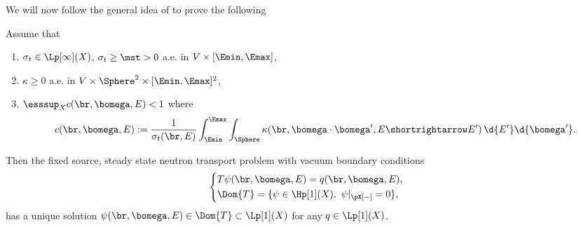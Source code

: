 We will now follow the general idea of \cite[Chap. XXI, \S 2, Proposition 5]{DautrayLions} to prove the following

\begin{theorem}\label{thm1}
Assume that
\begin{enumerate}[label=(\alph*)]
	\item $\sigma_t \in \Lp[\infty](X)$, $\sigma_t \geq \mst > 0$ a.e. in $V\times[\Emin,\Emax]$,
	\item $\kappa \geq 0$ a.e. in $V\times\Sphere^2\times[\Emin,\Emax]^2$,
	\item $\displaystyle\esssup_{X} c(\br,\bomega,E) < 1$ where
	  \begin{equation}\label{eq:c}
	    c(\br,\bomega,E) := \frac{1}{\sigma_t(\br,E)}\int_{\Emin}^{\Emax}\int_{\Sphere} \kappa(\br,\bomega\cdot\bomega',
	    E\shortrightarrow E')\,\d{E'}\d{\bomega'}.
	  \end{equation}
\end{enumerate}
Then the fixed source, steady state neutron transport problem with vacuum boundary conditions 
\begin{equation*}
  \left\{
  \begin{aligned}
     &T\psi(\br,\bomega,E) = q(\br,\bomega,E),\\
     &\Dom{T} = \{\psi\in \Hp[1](X),\ \psi\vert_{\pX[-]} = 0\},
  \end{aligned}
  \right.
\end{equation*}
has a unique solution $\psi(\br,\bomega,E)\in\Dom{T}\subset\Lp[1](X)$ for any $q\in \Lp[1](X)$.
\end{theorem}
